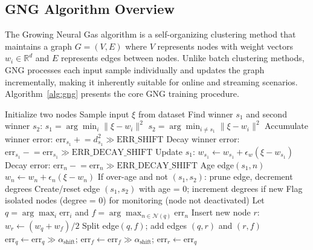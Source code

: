 \documentclass[conference]{IEEEtran}
\begin{document}
\subsection{GNG Algorithm Overview}
The Growing Neural Gas algorithm is a self-organizing clustering method that maintains a graph $G = (V, E)$ where $V$ represents nodes with weight vectors $w_i \in \mathbb{R}^d$ and $E$ represents edges between nodes. Unlike batch clustering methods, GNG processes each input sample individually and updates the graph incrementally, making it inherently suitable for online and streaming scenarios. Algorithm~\ref{alg:gng} presents the core GNG training procedure.

\begin{algorithm}[t]
\caption{Growing Neural Gas Training}
\label{alg:gng}
\begin{algorithmic}[1]
\STATE Initialize two nodes
    \STATE Sample input $\xi$ from dataset
    \STATE Find winner $s_1$ and second winner $s_2$:
    \STATE \quad $s_1 = \arg\min_i \|\xi - w_i\|^2$
    \STATE \quad $s_2 = \arg\min_{i \neq s_1} \|\xi - w_i\|^2$
    \STATE Accumulate winner error: $\mathrm{err}_{s_1} \mathrel{+}= d^2_{s_1} \gg \text{ERR\_SHIFT}$
    \STATE Decay winner error: $\mathrm{err}_{s_1} \mathrel{-}= \mathrm{err}_{s_1} \gg \text{ERR\_DECAY\_SHIFT}$
    \STATE Update $s_1$: $w_{s_1} \gets w_{s_1} + \epsilon_w(\xi - w_{s_1})$
        \STATE Decay error: $\mathrm{err}_n \mathrel{-}= \mathrm{err}_n \gg \text{ERR\_DECAY\_SHIFT}$
            \STATE Age edge$(s_1, n)$
            \STATE $w_n \gets w_n + \epsilon_n(\xi - w_n)$
            \STATE If over-age and not $(s_1, s_2)$: prune edge, decrement degrees
        \ENDIF
    \ENDFOR
    \STATE Create/reset edge $(s_1, s_2)$ with age = 0; increment degrees if new
    \STATE Flag isolated nodes (degree = 0) for monitoring (node not deactivated)
        \STATE Let $q = \arg\max_i \mathrm{err}_i$ and $f = \arg\max_{n \in \mathcal{N}(q)} \mathrm{err}_n$
        \STATE Insert new node $r$: $w_r \gets (w_q + w_f)/2$
        \STATE Split edge$(q,f)$; add edges $(q,r)$ and $(r,f)$
        \STATE $\mathrm{err}_q \gets \mathrm{err}_q \gg \alpha_{\text{shift}}$; $\mathrm{err}_f \gets \mathrm{err}_f \gg \alpha_{\text{shift}}$; $\mathrm{err}_r \gets \mathrm{err}_q$
    \ENDIF
\ENDFOR
\end{algorithmic}
\end{algorithm}
\end{document}
